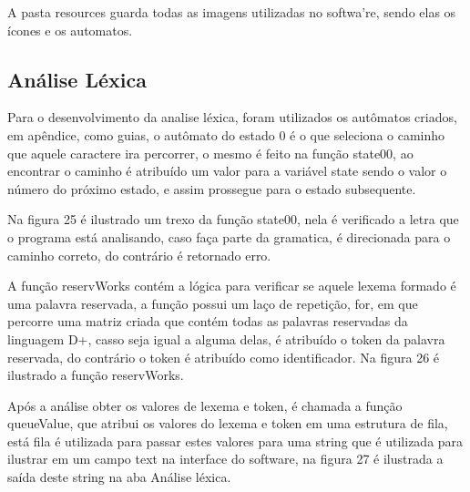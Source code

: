 \documentclass[12pt,oneside,a4paper,chapter=TITLE,section=TITLE,sumario=tradicional]{abntex2}
\begin{document}
A pasta resources guarda todas as imagens utilizadas no softwa're, sendo elas os ícones e os automatos.

\subsection{Análise Léxica}
\label{subsec:analiselexica}

Para o desenvolvimento da analise léxica, foram utilizados os autômatos criados, em apêndice, como guias, o autômato do estado 0 é o que seleciona o caminho que aquele caractere ira percorrer, o mesmo é feito na função state00, ao encontrar o caminho é atribuído um valor para a variável state sendo o valor o número do próximo estado, e assim prossegue para o estado subsequente.

Na figura 25 é ilustrado um trexo da função state00, nela é verificado a letra que o programa está analisando, caso faça parte da gramatica, é direcionada para o caminho correto, do contrário é retornado erro.

\begin{figure}[htb]
\end{figure} 

A função reservWorks contém a lógica para verificar se aquele lexema formado é uma palavra reservada, a função possui um laço de repetição, for, em que percorre uma matriz criada que contém todas as palavras reservadas da linguagem D+, casso seja igual a alguma delas, é atribuído o token da palavra reservada, do contrário o token é atribuído como identificador. Na figura 26 é ilustrado a função reservWorks.

\begin{figure}[htb]
\end{figure} 

Após a análise obter os valores de lexema e token, é chamada a função queueValue, que atribui os valores do lexema e token em uma estrutura de fila, está fila é utilizada para passar estes valores para uma string que é utilizada para ilustrar em um campo text na interface do software, na figura 27 é ilustrada a saída deste string na aba Análise léxica.

\begin{figure}[htb]
\end{figure} 
\end{document}
